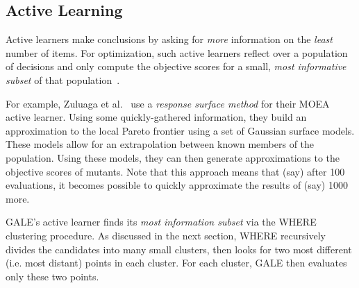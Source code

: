 \documentclass[10pt,journal,compsoc]{IEEEtran}
\begin{document}
\subsection{Active Learning}

Active learners make conclusions by asking for {\em
more} information on the {\em least} number of
items.  For optimization,  such active learners
reflect over a population of decisions and only
compute the objective scores for a small, {\em most
informative subset} of that
population~\cite{Zuluaga:13}.  

For example, Zuluaga et
al.~\cite{Zuluaga:13} use a {\em response surface
  method} for their MOEA active learner.  Using some
quickly-gathered information, they build an
approximation to the local Pareto frontier using a
set of Gaussian surface models. These models allow
for an extrapolation between known members of the
population.  Using these models, they can then
generate approximations to the objective scores of
mutants. Note that this approach means that (say)
after 100 evaluations, it becomes possible to
quickly approximate the results of (say) 1000 more.

GALE's active learner finds its {\em most information subset} via the WHERE
clustering procedure. As discussed in the next section,
WHERE recursively divides the candidates into many small clusters,
then looks for two most different (i.e. most distant) points
in each cluster. For each cluster, GALE then evaluates only these
two points. 
\end{document}
